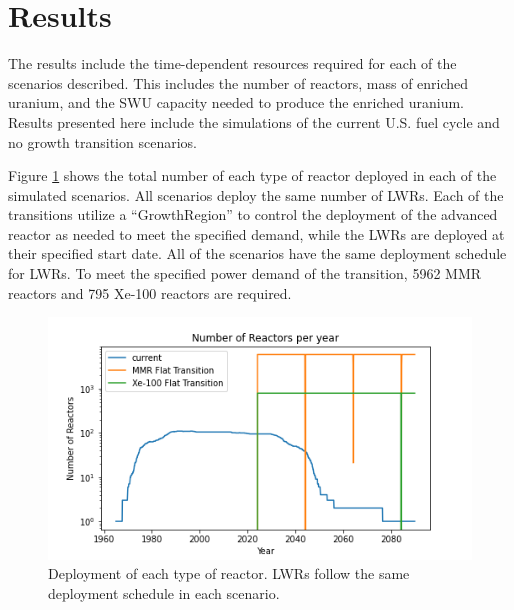 \section{Results}

The results include the time-dependent resources required 
for each of the scenarios described. This includes 
the number of reactors, mass of enriched uranium, and the 
\gls{SWU} capacity needed to produce the enriched uranium.
Results presented here include the simulations of the 
current U.S. fuel cycle and no growth transition scenarios. 

Figure \ref{fig:rx_deployment} shows the total number 
of each type of reactor deployed in each of the simulated 
scenarios. All scenarios deploy the same number of \gls{LWR}s. 
Each of the transitions utilize a \Cycamore ``GrowthRegion'' 
to control the deployment of the advanced reactor as needed 
to meet the specified demand, while the \gls{LWR}s are 
deployed at their specified start date. All of the scenarios 
have the same deployment schedule for \gls{LWR}s. To meet the
specified power demand of the transition, 5962 
\gls{MMR} reactors and 795 Xe-100 reactors are required.  


\begin{figure}[ht]
    \centering
    \includegraphics[scale=0.5]{figures/rx_deployment_all.png}
    \caption{Deployment of each type of reactor. \gls{LWR}s follow 
    the same deployment schedule in each scenario.}
    \label{fig:rx_deployment}
\end{figure}

